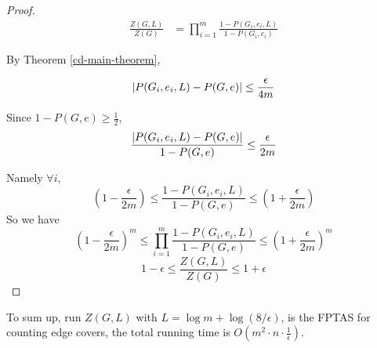 \begin{proof}

	\begin{align*}
		\frac{Z(G,L)}{Z(G)} &= \prod_{i=1}^m \frac{1-P(G_i, e_i, L)}{1-P(G_i, e_i)}
	\end{align*}

	By Theorem \ref{cd-main-theorem},

	\[\left\vert P(G_i, e_i, L) - P(G,e)\right\vert \leq \frac{\epsilon}{4m}\]

	Since $1-P(G,e) \geq \frac{1}{2}$,
	\[ \frac{\left\vert P(G_i, e_i, L) - P(G,e)\right\vert}{1 - P(G,e)} \leq \frac{\epsilon}{2m}\]
	
	Namely $\forall i$,
	\[ \left( 1 - \frac{\epsilon}{2m} \right) \leq \frac{1-P(G_i, e_i, L)}{1 - P(G,e)} \leq \left( 1 + \frac{\epsilon}{2m} \right)\]
	So we have
	\[ \left( 1 - \frac{\epsilon}{2m} \right)^m \leq \prod_{i=1}^m \frac{1-P(G_i, e_i, L)}{1 - P(G,e)} \leq \left( 1 + \frac{\epsilon}{2m} \right)^m\]
	\[ 1- \epsilon \leq \frac{Z(G, L)}{Z(G)} \leq 1+ \epsilon\]


\end{proof}

To sum up, run $Z(G, L)$ with $L = \log m + \log(8/ \epsilon)$, is the FPTAS for counting edge covers,
the total running time is $O(m^2 \cdot n \cdot \frac{1}{\epsilon})$.
